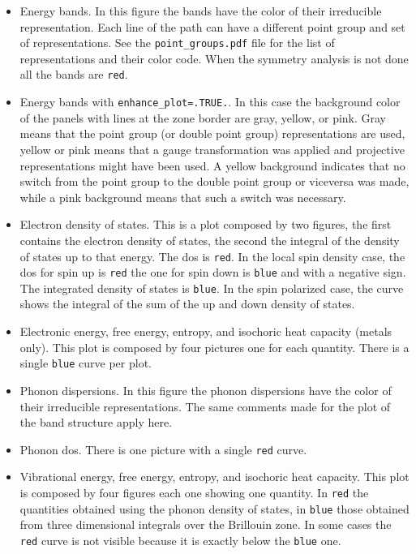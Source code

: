 \documentclass[12pt,a4paper]{article}
\begin{document}
\begin{itemize}
\item
Energy bands. In this figure the bands have the color of
their irreducible representation. Each line of the path can have a different
point group and set of representations. See the \texttt{point\_groups.pdf} file
for the list of representations and their color code. 
When the symmetry analysis is not done all the bands are \texttt{red}.

\item
Energy bands with \texttt{enhance\_plot=.TRUE.}. In this case 
the background color of the panels with lines at the zone border are 
gray, yellow, or pink. Gray means that the point group (or double point
group) representations are used, yellow or pink means that a gauge 
transformation was applied and projective representations might have been used. 
A yellow background indicates that no switch 
from the point group to the double point group or viceversa was made, 
while a pink background means that such a switch was necessary.
                              
\item
Electron density of states. This is a plot composed by two figures,
the first contains the electron density of states, the second the integral
of the density of states up to that energy. The dos is \texttt{red}.
In the local spin density case, the dos for spin up is \texttt{red} the
one for spin down is \texttt{blue} and with a negative sign.          
The integrated density of states is \texttt{blue}. In the spin polarized
case, the curve shows the integral of the sum of the up and down density 
of states.

\item
Electronic energy, free energy, entropy, and isochoric heat capacity 
(metals only). This plot is composed by four pictures one for each
quantity. There is a single \texttt{blue} curve per plot.      

\item
Phonon dispersions. In this figure the phonon dispersions have the color 
of their irreducible representations. The same comments made for the plot of 
the band structure apply here.                       

\item
Phonon dos. There is one picture with a single \texttt{red} curve.  
   
\item
Vibrational energy, free energy, entropy, and isochoric heat capacity. This plot
is composed by four figures each one showing one quantity. In \texttt{red} the 
quantities obtained using the phonon density of states, 
in \texttt{blue} those obtained from three dimensional integrals over 
the Brillouin zone. In some cases the \texttt{red} curve is not visible 
because it is exactly below the \texttt{blue} one.


\end{itemize}
\end{document}
